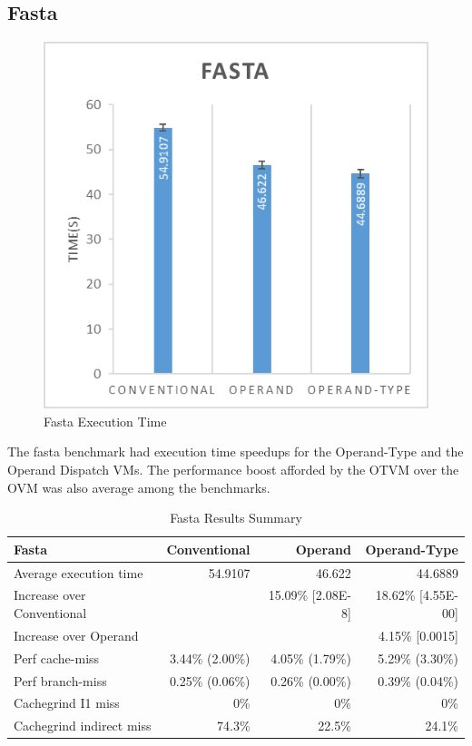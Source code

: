 \documentclass[english,a4paper,12pt]{report}
\begin{document}
\subsection{Fasta}

\begin{figure}[!htb]
  \centering
  \includegraphics{fasta.png}
  \caption{Fasta Execution Time}
  \label{fig:fasta-time}
\end{figure}

The fasta benchmark had execution time speedups for the Operand-Type
and the Operand Dispatch VMs. The performance boost afforded by the
OTVM over the OVM was also average among the benchmarks.

\begin{table}[!htb]
  \begin{center}
    \begin{tabular}{lrrr}
      Fasta & Conventional & Operand & Operand-Type\\
      \hline
      Average execution time & 54.9107 & 46.622 & 44.6889\\
      Increase over Conventional &  & 15.09\% [2.08E-8] & 18.62\% [4.55E-00]\\
      Increase over Operand &  &  & 4.15\% [0.0015]\\
      Perf cache-miss & 3.44\% (2.00\%) & 4.05\% (1.79\%) & 5.29\% (3.30\%)\\
      Perf branch-miss & 0.25\% (0.06\%) & 0.26\% (0.00\%) & 0.39\% (0.04\%)\\
      Cachegrind I1 miss & 0\% & 0\% & 0\%\\
      Cachegrind indirect miss & 74.3\% & 22.5\% & 24.1\%\\
    \end{tabular}
  \end{center}
  \caption{Fasta Results Summary}
\end{table}
\newpage
\end{document}
